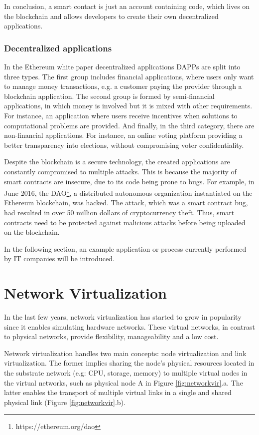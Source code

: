In conclusion, a smart contact is just an account containing code, which lives on the blockchain and allows developers to create their own decentralized applications. 

\subsubsection{Decentralized applications}

In the Ethereum white paper \cite{buterin2014next} decentralized applications DAPPs are split into three types. The first group includes financial applications, where users only want to manage money transactions, e.g. a customer paying the provider through a blockchain application. The second group is formed by semi-financial applications, in which money is involved but it is mixed with other requirements. For instance, an application where users receive incentives when solutions to computational problems are provided. And finally, in the third category, there are non-financial applications. For instance, an online voting platform providing a better transparency into elections, without compromising voter confidentiality.

Despite the blockchain is a secure technology, the created applications are constantly compromised to multiple attacks. This is because the majority of smart contracts are insecure, due to its code being prone to bugs.
For example, in June 2016, the DAO\footnote{https://ethereum.org/dao}, a distributed autonomous organization instantiated on the Ethereum blockchain, was hacked. The attack, which was a smart contract bug, had resulted in over 50 million dollars of cryptocurrency theft. Thus, smart contracts need to be protected against malicious attacks before being uploaded on the blockchain.

In the following section, an example application or process currently performed by IT companies will be introduced.


\section{Network Virtualization} \label{networkvirtualization}

In the last few years, network virtualization has started to grow in popularity since it enables simulating hardware networks. These virtual networks, in contrast to physical networks, provide flexibility, manageability and a low cost. 

Network virtualization handles two main concepts: node virtualization and link virtualization. The former implies sharing the node's physical resources located in the substrate network (e.g: CPU, storage, memory) to multiple virtual nodes in the virtual networks, such as physical node A in Figure \ref{fig:networkvir}.a. The latter enables the transport of multiple virtual links in a single and shared physical link (Figure \ref{fig:networkvir}.b).

